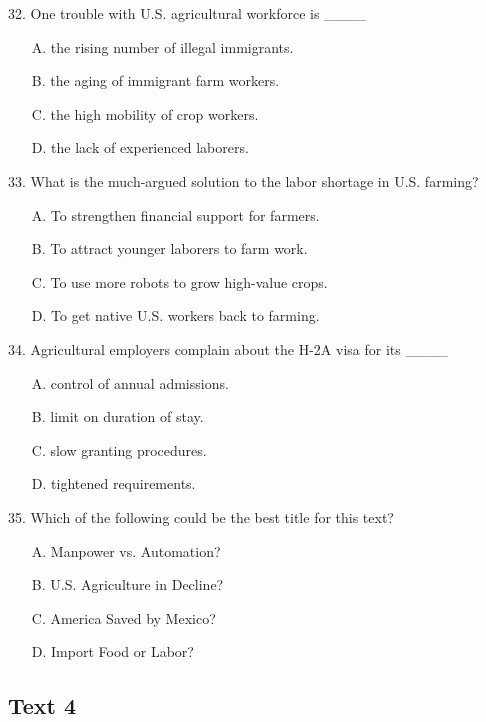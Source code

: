 \documentclass[UTF8,11pt]{ctexart}
\begin{document}
32. One trouble with U.S. agricultural workforce is \_\_\_\_


\begin{itemize}[leftmargin=2em,itemsep=.2em,topsep=.4em]\item[A.] the rising number of illegal immigrants.
\item[B.] the aging of immigrant farm workers.
\item[C.] the high mobility of crop workers.
\item[D.] the lack of experienced laborers.
\end{itemize}

33. What is the much-argued solution to the labor shortage in U.S. farming?


\begin{itemize}[leftmargin=2em,itemsep=.2em,topsep=.4em]\item[A.] To strengthen financial support for farmers.
\item[B.] To attract younger laborers to farm work.
\item[C.] To use more robots to grow high-value crops.
\item[D.] To get native U.S. workers back to farming.
\end{itemize}

34. Agricultural employers complain about the H-2A visa for its \_\_\_\_


\begin{itemize}[leftmargin=2em,itemsep=.2em,topsep=.4em]\item[A.] control of annual admissions.
\item[B.] limit on duration of stay.
\item[C.] slow granting procedures.
\item[D.] tightened requirements.
\end{itemize}

35. Which of the following could be the best title for this text?


\begin{itemize}[leftmargin=2em,itemsep=.2em,topsep=.4em]\item[A.] Manpower vs. Automation?
\item[B.] U.S. Agriculture in Decline?
\item[C.] America Saved by Mexico?
\item[D.] Import Food or Labor?
\end{itemize}

\subsection*{\textbf{Text 4}}
\end{document}
